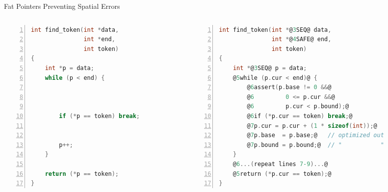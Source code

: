 \documentclass[aspectratio=169]{beamer}
\begin{document}
\begin{frame}[fragile]{Fat Pointers Preventing Spatial Errors}
    \begin{columns}[T]
      \begin{column}{0.44\textwidth}
\begin{lstlisting}[language=C,numbers=left,mathescape,basicstyle={\scriptsize\ttfamily}]
int find_token(int *data,
               int *end,
               int token)
{
    int *p = data;
    while (p < end) {



        if (*p == token) break;


        p++;
    }

    return (*p == token);
}
\end{lstlisting}
\end{column}

\pause

\begin{column}{0.56\textwidth}

\begin{lstlisting}[language=C,numbers=left,mathescape,basicstyle={\scriptsize\ttfamily},
    moredelim={**[is][\btHL<3>]{@3}{@}},
    moredelim={**[is][{\btHL<4>}]{@4}{@}},
    moredelim={**[is][{\btHL<5>}]{@5}{@}},
    moredelim={**[is][{\btHL<6>}]{@6}{@}},
    moredelim={**[is][{\btHL<7>}]{@7}{@}},
    moredelim={**[is][{\btHL<8>}]{@8}{@}}
]
int find_token(int *@3SEQ@ data,
               int *@4SAFE@ end,
               int token)
{
    int *@3SEQ@ p = data;
    @5while (p.cur < end)@ {
        @6assert(p.base != 0 &&@
        @6         0 <= p.cur &&@
        @6         p.cur < p.bound);@
        @6if (*p.cur == token) break;@
        @7p.cur = p.cur + (1 * sizeof(int));@
        @7p.base  = p.base;@   // optimized out
        @7p.bound = p.bound;@  // "           "
    }
    @6...(repeat lines 7-9)...@
    @5return (*p.cur == token);@
}
\end{lstlisting}
\end{column}

\end{columns}
\end{frame}
\end{document}
